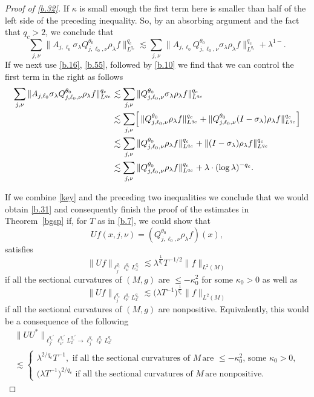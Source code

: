 \documentclass[10pt]{amsart}
\newcommand{\la}{\lambda}
\newcommand{\1}{{\bf 1}}
\begin{document}
\begin{proof}[Proof of \eqref{b.32}]
 If $\kappa$ is small enough the first term here is smaller than half of the left side of the preceding inequality.
 So, by an absorbing argument and the fact that $q_c>2$, we conclude that
 $$ \sum_{j,\nu} \| A_{j,\ell_0}\sigma_\la Q^{\theta_0}_{j,\ell_0,\nu}\rho_\la f\|_{L^{q_c}}^{q_c}
 \lesssim \sum_{j,\nu} \| A_{j,\ell_0} Q^{\theta_0}_{j,\ell_0,\nu}\sigma_\la \rho_\la f\|_{L^{q_c}}^{q_c}
 +\la^{1-}.
 $$
 If we next use \eqref{b.16}, \eqref{b.55}, followed by \eqref{b.10} we find that we can
 control the first term in the right as follows
 \begin{align*}
 \sum_{j,\nu} \| A_{j,\ell_0}\sigma_\la Q^{\theta_0}_{j,\ell_0,\nu}\rho_\la f\|_{L^{q_c}}^{q_c}
& \lesssim 
 \sum_{j,\nu} \|  Q^{\theta_0}_{j,\ell_0,\nu}  \sigma_\la   \rho_\la f\|_{L^{q_c}}^{q_c}
 \\
 &\lesssim
 \sum_{j,\nu}  \Bigl[ \, \|  Q^{\theta_0}_{j,\ell_0,\nu} \rho_\la f\|_{L^{q_c}}^{q_c}
 +
 \|  Q^{\theta_0}_{j,\ell_0,\nu} (I-\sigma_\la) \rho_\la f\|_{L^{q_c}}^{q_c}
 \Bigr]
 \\
 &\lesssim  \sum_{j,\nu}  \|  Q^{\theta_0}_{j,\ell_0,\nu} \rho_\la f\|_{L^{q_c}}^{q_c} + \|(I-\sigma_\la)\rho_\la f\|_{L^{q_c}}^{q_c}
 \\  &\lesssim  \sum_{j,\nu}  \|  Q^{\theta_0}_{j,\ell_0,\nu} \rho_\la f\|_{L^{q_c}}^{q_c} + \la \cdot (\log\la)^{-q_c}.
\end{align*}


If we combine \eqref{key} and the preceding two inequalities we conclude that we would obtain \eqref{b.31} and consequently
finish the proof of the estimates in Theorem~\ref{bgsp} if, for $T$ as in \eqref{b.7}, we could show that
\begin{equation}\label{b.77}
Uf(x,j,\nu)  =(Q^{\theta_0}_{j,\ell_0,\nu} \rho_\la f)(x),
\end{equation}
satisfies
$$
\| Uf \|_{\ell_j^{q_c}\ell_\nu^{q_c}L^{q_c}_x} \lesssim \la^{\frac1{q_c}} T^{-1/2} \|f\|_{L^2(M)}
$$
if all the sectional curvatures of $(M,g)$ are $\le-\kappa_0^2$ for some $\kappa_0>0$ as well
as
$$
\| Uf \|_{\ell_j^{q_c}\ell_\nu^{q_c}L^{q_c}_x} \lesssim \bigl(\la T^{-1}\bigr)^{\frac1{q_c}}  \|f\|_{L^2(M)} $$
if  all the sectional curvatures of  $(M,g)$ are nonpositive.  Equivalently, this would be a consequence
of the following
\begin{multline}\label{b.78}
\| UU^* \|_{\ell_{j'}^{q_c'}\ell_{\nu'}^{q_c'} L^{q_c'}_x \to \ell^{q_c}_j \ell^{q_c}_\nu L^{q_c}_x}
\\
\lesssim
\begin{cases}
\la^{2/q_c}T^{-1}, 
\, \, \text{if all the sectional curvatures of } 
M \, \text{are } \le -\kappa_0^2, \,
\text{some }\kappa_0>0,
\\ \bigl(\la T^{-1}\bigr)^{2/q_c}
\, \, \text{if all the sectional curvatures of } 
M \, \text{are nonpositive}.
\end{cases}
\end{multline}



\end{proof}
\end{document}
